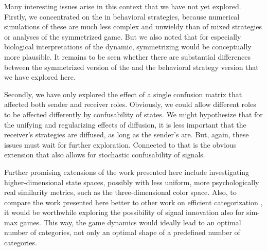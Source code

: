 Many interesting issues arise in this context that we have not yet
explored. Firstly, we concentrated on the \rdd in behavioral
strategies, because numerical simulations of these are much less
complex and unwieldy than of mixed strategies or analyses of the
symmetrized game. But we also noted that for especially biological
interpretations of the dynamic, symmetrizing would be conceptually
more plausible. It remains to be seen whether there are substantial
differences between the symmetrized version of the \rdd and the
behavioral strategy version that we have explored here.

Secondly, we have only explored the effect of a single confusion
matrix that affected both sender and receiver roles. Obviously, we
could allow different roles to be affected differently by
confusability of states. We might hypothesize that for the unifying
and regularizing effects of diffusion, it is less important that the
receiver's strategies are diffused, as long as the sender's are. But,
again, these issues must wait for further exploration. Connected to
that is the obvious extension that also allows for stochastic
confusability of signals.

Further promising extensions of the work presented here include
investigating higher-dimensional state spaces, possibly with less
uniform, more psychologically real similarity metrics, such as the
three-dimensional color space. Also, to compare the work presented
here better to other work on efficient categorization
\citep[e.g.][]{Mohlin2014:Optimal-Categor}, it would be worthwhile
exploring the possibility of signal innovation
\citep[e.g.][]{McKenzie-AlexanderSkymrs2012:Inventing-New-S} also for
sim-max games. This way, the game dynamics would ideally lead to an
optimal number of categories, not only an optimal shape of a
predefined number of categories.




